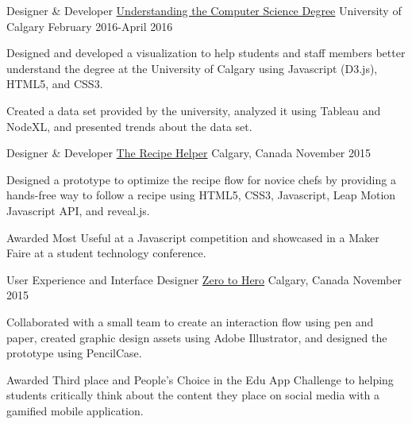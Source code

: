 \begin{cventries}
\cventry
    {Designer \& Developer}
    {\href{https://medium.com/portfolio-carrie-mah/understanding-degrees-through-better-visualizations-fec3319b7daa}{Understanding the Computer Science Degree}}
    {University of Calgary}
    {February 2016-April 2016}
    {
      \begin{cvitems}
        \item {Designed and developed a visualization to help students and staff members better understand the degree at the University of Calgary using Javascript (D3.js), HTML5, and CSS3.}
        \item {Created a data set provided by the university, analyzed it using Tableau and NodeXL, and presented trends about the data set.}
      \end{cvitems}
    }
    
    
  \cventry
    {Designer \& Developer}
    {\href{https://medium.com/portfolio-carrie-mah/the-recipe-helper-834686422f52}{The Recipe Helper}}
    {Calgary, Canada}
    {November 2015}
    {
      \begin{cvitems}
      	\item{Designed a prototype to optimize the recipe flow for novice chefs by providing a hands-free way to follow a recipe using HTML5, CSS3, Javascript, Leap Motion Javascript API, and reveal.js.}
        \item {Awarded Most Useful at a Javascript competition and showcased in a Maker Faire at a student technology conference.}
      \end{cvitems}
    }
 \cventry
    {User Experience and Interface Designer}
    {\href{https://medium.com/portfolio-carrie-mah/utilizing-gamification-to-inform-better-social-media-habits-b4f47c3e5349}{Zero to Hero}}
    {Calgary, Canada}
    {November 2015}
    {
      \begin{cvitems}
      	\item {Collaborated with a small team to create an interaction flow using pen and paper, created graphic design assets using Adobe Illustrator, and designed the prototype using PencilCase.}
        \item {Awarded Third place and People's Choice in the Edu App Challenge to helping students critically think about the content they place on social media with a gamified mobile application.}
      \end{cvitems}
    }
\end{cventries}
